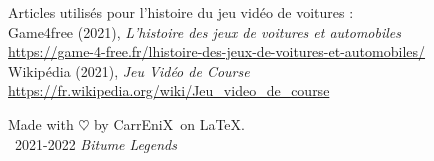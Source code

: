 \documentclass[12pt,a4paper]{article}
\newcommand{\btmlgs}{\textit{Bitume Legends}}
\newcommand{\CEX}{CarrEniX}
\begin{document}
\begin{thebibliography}{9}
    Articles utilisés pour l'histoire du jeu vidéo de voitures :\\

    Game4free (2021), \emph{L'histoire des jeux de voitures et automobiles}\\
    \url{https://game-4-free.fr/lhistoire-des-jeux-de-voitures-et-automobiles/}\\

    Wikipédia (2021), \emph{Jeu Vidéo de Course} \\
    \url{https://fr.wikipedia.org/wiki/Jeu_video_de_course}\\

\end{thebibliography}

\begin{center}
    Made with $\heartsuit$ by \CEX\, on \LaTeX.\\
    \textcopyright\, 2021-2022 \btmlgs
\end{center}
\end{document}
